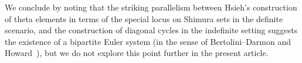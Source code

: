 \documentclass{amsart}
\numberwithin{equation}{section}
\begin{document}
\subsubsection{} We conclude by noting that the striking parallelism between Hsieh's construction of theta elements in terms of the special locus on Shimura sets in the definite scenario, and the construction of diagonal cycles in the indefinite setting suggests the existence of a bipartite Euler system (in the sense of Bertolini--Darmon and Howard~\cite{BertoliniDarmon2005, howard06}), but we do not explore this point further in the present article. 


\end{document}
